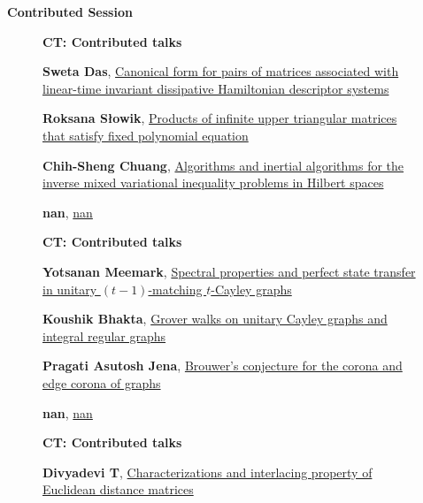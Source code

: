 \documentclass[ILAS2025-program.tex]{subfiles}
\begin{document}
\begin{description}
    \item[] \textbf{Contributed Session} 
    \begin{description}
    \item[] {\color{mstitle}\textbf{CT: Contributed talks}} 
    \item[] \hypertarget{up0076}{}\textbf{Sweta Das}, \hyperlink{down0076}{Canonical form for pairs of matrices associated with linear-time invariant dissipative Hamiltonian descriptor systems}
        \item[] \hypertarget{up0077}{}\textbf{Roksana Słowik}, \hyperlink{down0077}{Products of infinite upper triangular matrices that satisfy fixed polynomial equation}
        \item[] \hypertarget{up0078}{}\textbf{Chih-Sheng Chuang}, \hyperlink{down0078}{Algorithms and inertial algorithms for the inverse mixed variational inequality problems in Hilbert spaces}
        \item[] \hypertarget{up0079}{}\textbf{nan}, \hyperlink{down0079}{nan}
        \end{description}
    \begin{description}
    \item[] {\color{mstitle}\textbf{CT: Contributed talks}} 
    \item[] \hypertarget{up0080}{}\textbf{Yotsanan Meemark}, \hyperlink{down0080}{Spectral properties and perfect state transfer in unitary $(t-1)$-matching $t$-Cayley graphs}
        \item[] \hypertarget{up0081}{}\textbf{Koushik Bhakta}, \hyperlink{down0081}{Grover walks on unitary Cayley graphs and integral regular graphs}
        \item[] \hypertarget{up0082}{}\textbf{Pragati Asutosh Jena}, \hyperlink{down0082}{Brouwer's conjecture for the corona and edge corona of graphs}
        \item[] \hypertarget{up0083}{}\textbf{nan}, \hyperlink{down0083}{nan}
        \end{description}
    \begin{description}
    \item[] {\color{mstitle}\textbf{CT: Contributed talks}} 
    \item[] \hypertarget{up0084}{}\textbf{Divyadevi T}, \hyperlink{down0084}{Characterizations and interlacing property of Euclidean distance matrices}

\end{description}
\end{description}
\end{document}
